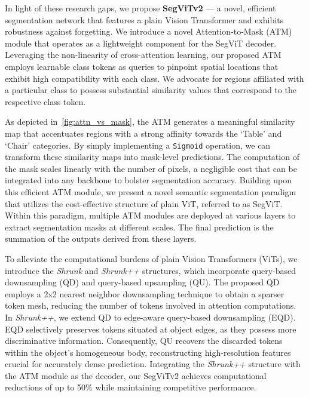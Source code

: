 In light of these research gaps, we propose \textbf{SegViTv2} — a novel, efficient segmentation network that features a plain Vision Transformer and exhibits robustness against forgetting. We introduce a novel Attention-to-Mask (ATM) module that operates as a lightweight component for the SegViT decoder. Leveraging the non-linearity of cross-attention learning, our proposed ATM employs learnable class tokens as queries to pinpoint spatial locations that exhibit high compatibility with each class. We advocate for regions affiliated with a particular class to possess substantial similarity values that correspond to the respective class token.

As depicted in~\cref{fig:attn_vs_mask}, the ATM generates a meaningful similarity map that accentuates regions with a strong affinity towards the `Table' and `Chair' categories. By simply implementing a {\tt Sigmoid} operation, we can transform these similarity maps into mask-level predictions. The computation of the mask scales linearly with the number of pixels, a negligible cost that can be integrated into any backbone to bolster segmentation accuracy. Building upon this efficient ATM module, we present a novel semantic segmentation paradigm that utilizes the cost-effective structure of plain ViT, referred to as SegViT. Within this paradigm, multiple ATM modules are deployed at various layers to extract segmentation masks at different scales. The final prediction is the summation of the outputs derived from these layers.

To alleviate the computational burdens of plain Vision Transformers (ViTs), we introduce the \emph{Shrunk} and \emph{Shrunk++} structures, which incorporate query-based downsampling (QD) and query-based upsampling (QU).  The proposed QD employs a 2x2 nearest neighbor downsampling technique to obtain a sparser token mesh, reducing the number of tokens involved in attention computations. In \textit{Shrunk++}, we extend QD to edge-aware query-based downsampling (EQD). EQD selectively preserves tokens situated at object edges, as they possess more discriminative information. Consequently, QU recovers the discarded tokens within the object's homogeneous body, reconstructing high-resolution features crucial for accurately dense prediction. Integrating the \emph{Shrunk++} structure with the ATM module as the decoder, our SegViTv2 achieves computational reductions of up to 50\% while maintaining competitive performance.

